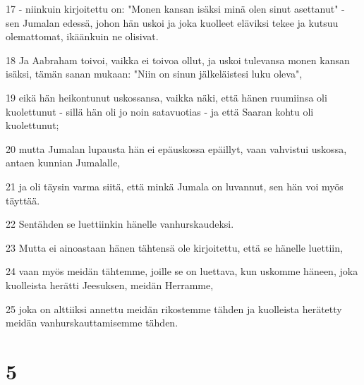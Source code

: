 \par 17 - niinkuin kirjoitettu on: "Monen kansan isäksi minä olen sinut asettanut" - sen Jumalan edessä, johon hän uskoi ja joka kuolleet eläviksi tekee ja kutsuu olemattomat, ikäänkuin ne olisivat.
\par 18 Ja Aabraham toivoi, vaikka ei toivoa ollut, ja uskoi tulevansa monen kansan isäksi, tämän sanan mukaan: "Niin on sinun jälkeläistesi luku oleva",
\par 19 eikä hän heikontunut uskossansa, vaikka näki, että hänen ruumiinsa oli kuolettunut - sillä hän oli jo noin satavuotias - ja että Saaran kohtu oli kuolettunut;
\par 20 mutta Jumalan lupausta hän ei epäuskossa epäillyt, vaan vahvistui uskossa, antaen kunnian Jumalalle,
\par 21 ja oli täysin varma siitä, että minkä Jumala on luvannut, sen hän voi myös täyttää.
\par 22 Sentähden se luettiinkin hänelle vanhurskaudeksi.
\par 23 Mutta ei ainoastaan hänen tähtensä ole kirjoitettu, että se hänelle luettiin,
\par 24 vaan myös meidän tähtemme, joille se on luettava, kun uskomme häneen, joka kuolleista herätti Jeesuksen, meidän Herramme,
\par 25 joka on alttiiksi annettu meidän rikostemme tähden ja kuolleista herätetty meidän vanhurskauttamisemme tähden.

\chapter{5}

